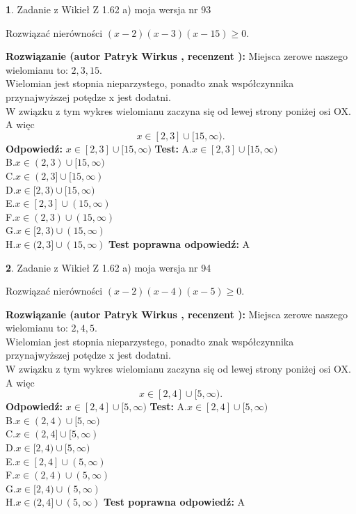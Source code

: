 \documentclass[12pt, a4paper]{article}
\theoremstyle{definition} %
\newtheorem{zad}{}
\newcommand{\zadStart}[1]{\begin{zad}#1\newline}
\newcommand{\zadStop}{\end{zad}}
\newcommand{\rozwStart}[2]{\noindent \textbf{Rozwiązanie (autor #1 , recenzent #2): }\newline}
\newcommand{\rozwStop}{\newline}
\newcommand{\odpStart}{\noindent \textbf{Odpowiedź:}\newline}
\newcommand{\odpStop}{\newline}
\newcommand{\testStart}{\noindent \textbf{Test:}\newline}
\newcommand{\testStop}{\newline}
\newcommand{\kluczStart}{\noindent \textbf{Test poprawna odpowiedź:}\newline}
\newcommand{\kluczStop}{\newline}
\begin{document}
\zadStart{Zadanie z Wikieł Z 1.62 a) moja wersja nr 93}

Rozwiązać nierówności $(x-2)(x-3)(x-15)\ge0$.
\zadStop
\rozwStart{Patryk Wirkus}{}
Miejsca zerowe naszego wielomianu to: $2, 3, 15$.\\
Wielomian jest stopnia nieparzystego, ponadto znak współczynnika przy\linebreak najwyższej potędze x jest dodatni.\\ W związku z tym wykres wielomianu zaczyna się od lewej strony poniżej osi OX. A więc $$x \in [2,3] \cup [15,\infty).$$
\rozwStop
\odpStart
$x \in [2,3] \cup [15,\infty)$
\odpStop
\testStart
A.$x \in [2,3] \cup [15,\infty)$\\
B.$x \in (2,3) \cup [15,\infty)$\\
C.$x \in (2,3] \cup [15,\infty)$\\
D.$x \in [2,3) \cup [15,\infty)$\\
E.$x \in [2,3] \cup (15,\infty)$\\
F.$x \in (2,3) \cup (15,\infty)$\\
G.$x \in [2,3) \cup (15,\infty)$\\
H.$x \in (2,3] \cup (15,\infty)$
\testStop
\kluczStart
A
\kluczStop



\zadStart{Zadanie z Wikieł Z 1.62 a) moja wersja nr 94}

Rozwiązać nierówności $(x-2)(x-4)(x-5)\ge0$.
\zadStop
\rozwStart{Patryk Wirkus}{}
Miejsca zerowe naszego wielomianu to: $2, 4, 5$.\\
Wielomian jest stopnia nieparzystego, ponadto znak współczynnika przy\linebreak najwyższej potędze x jest dodatni.\\ W związku z tym wykres wielomianu zaczyna się od lewej strony poniżej osi OX. A więc $$x \in [2,4] \cup [5,\infty).$$
\rozwStop
\odpStart
$x \in [2,4] \cup [5,\infty)$
\odpStop
\testStart
A.$x \in [2,4] \cup [5,\infty)$\\
B.$x \in (2,4) \cup [5,\infty)$\\
C.$x \in (2,4] \cup [5,\infty)$\\
D.$x \in [2,4) \cup [5,\infty)$\\
E.$x \in [2,4] \cup (5,\infty)$\\
F.$x \in (2,4) \cup (5,\infty)$\\
G.$x \in [2,4) \cup (5,\infty)$\\
H.$x \in (2,4] \cup (5,\infty)$
\testStop
\kluczStart
A
\kluczStop
\end{document}

